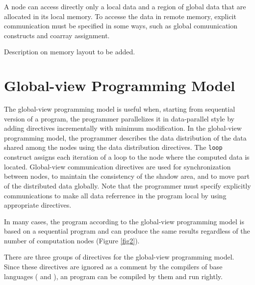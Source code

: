 
A node can access directly only a local data and a region of global data
that are allocated in its local memory.
%
To accesse the data in remote memory, explicit communication must be
specified in some ways, such as global comuunication constructs and
coarray assignment.

Description on memory layout to be added.

\section{Global-view Programming Model}

The global-view programming model is useful when, starting from
sequential version of a program, the programmer parallelizes it in
data-parallel style by adding directives incrementally with minimum 
modification.
%
In the global-view programming model, the programmer describes the data
distribution of the data shared among the nodes using the data
distribution directives.
%
The {\tt loop} construct assigns each iteration of a loop to the node
where the computed data is located. 
%
Global-view communication directives are used for synchronization
between nodes, to maintain the consistency of the shadow area, and to
move part of the distributed data globally.
%
Note that the programmer must specify explicitly communications to make
all data referrence in the program local by using appropriate directives.

In many cases, the {\XMP} program according to the global-view
programming model is based on a sequential program and can produce the
same results regardless of the number of computation nodes (Figure
\ref{fig2}).

There are three groups of directives for the global-view programming
model. Since these directives are ignored as a comment by the
compilers of base languages ({\C} and {\Fort}), an {\XMP} program can be
compiled by them and run rightly.

